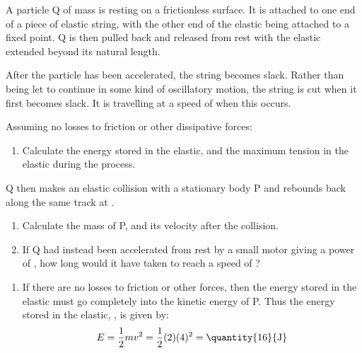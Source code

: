 
\begin{problem}[AO1984PIQ1a]
{A particle Q of mass  is resting on a frictionless surface. It is attached to one end of a piece of elastic string, with the other end of the elastic being attached to a fixed point. Q is then pulled back and released from rest with the elastic extended  beyond its natural length. 

After the particle has been accelerated, the string becomes slack. Rather than being let to continue in some kind of oscillatory motion, the string is cut when it first becomes slack. It is travelling at a speed of  when this occurs.

Assuming no losses to friction or other dissipative forces:
\begin{enumerate}
	\item Calculate the energy stored in the elastic, and the maximum tension in the elastic during the process.
\end{enumerate}
Q then makes an elastic collision with a stationary body P and rebounds back along the same track at . 
\begin{enumerate}[resume]
	\item Calculate the mass of P, and its velocity after the collision.
	\item If Q had instead been accelerated from rest by a small motor giving a power of , how long would it have taken to reach a speed of ?
\end{enumerate}
\vspace{-0.4cm}
}
{}
{\begin{enumerate}
	\item If there are no losses to friction or other forces, then the energy stored in the elastic must go completely into the kinetic energy of P. Thus the energy stored in the elastic, , is given by:
\begin{align*} 
E = \frac{1}{2}mv^{2} = \frac{1}{2}(2)(4)^{2} = \mbox{\quantity{16}{J}} 
\end{align*}


\end{enumerate}}
\end{problem}
